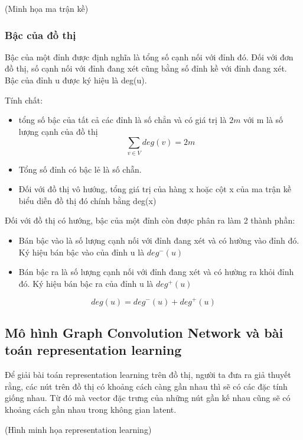 (Minh họa ma trận kề)

\subsubsection{Bậc của đồ thị}

Bậc của một đỉnh được định nghĩa là tổng số cạnh nối với đỉnh đó. Đối với đơn đồ thị, số cạnh nối với đỉnh đang xét cũng bằng số đỉnh kề với đỉnh đang xét. Bậc của đỉnh u được ký hiệu là deg(u).

Tính chất:
\begin{itemize}
	\item tổng số bậc của tất cả các đỉnh là số chẳn và có giá trị là $2m$ với m là số lượng cạnh của đồ thị
	\begin{equation*}
		\sum_{v \in V}{deg(v)} = 2m
	\end{equation*}
	\item Tổng số đỉnh có bậc lẻ là số chẵn.
	\item Đối với đồ thị vô hướng, tổng giá trị của hàng x hoặc cột x của ma trận kề biểu diễn đồ thị đó chính bằng deg(x)
\end{itemize}

Đối với đồ thị có hướng, bậc của một đỉnh còn được phân ra làm 2 thành phần:
\begin{itemize}
	\item Bán bậc vào là số lượng cạnh nối với đỉnh đang xét và có hường vào đỉnh đó. Ký hiệu bán bậc vào của đỉnh u là $deg^-(u)$
	\item Bán bậc ra là số lượng cạnh nối với đỉnh đang xét và có hường ra khỏi đỉnh đó. Ký hiệu bán bậc ra của đỉnh u là $deg^+(u)$
\end{itemize}

\begin{equation*}
	deg(u) = deg^-(u) + deg^+(u)
\end{equation*}

\subsection{Mô hình Graph Convolution Network và bài toán representation learning}

Để giải bài toán representation learning trên đồ thị, người ta đưa ra giả thuyết rằng, các nút trên đồ thị có khoảng cách càng gần nhau thì sẽ có các đặc tính giống nhau. Từ đó mà vector đặc trưng của những nút gần kế nhau cũng sẽ có khoảng cách gần nhau trong không gian latent.

(Hình minh họa representation learning)

